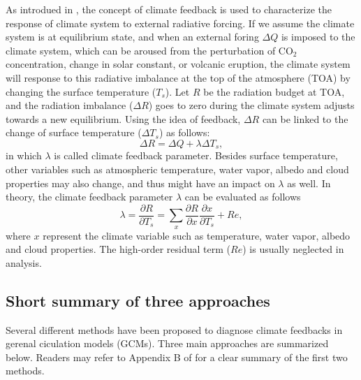 As introdued in , 
the concept of climate feedback is used to characterize the response of climate system to external radiative forcing. If we assume the climate system is at equilibrium state, and when an external foring $\Delta Q$ is imposed to the climate system, which can be aroused from the perturbation of CO$_2$ concentration, change in solar constant, or volcanic eruption, the climate system will response to this radiative imbalance at the top of the atmosphere (TOA) by changing the surface temperature ($T_s$). Let $R$ be the radiation budget at TOA, and the radiation imbalance ($\Delta R$) goes to zero during the climate system adjusts towards a new equilibrium. Using the idea of feedback, $\Delta R$ can be linked to the change of surface temperature ($\Delta T_s$) as follows:
\begin{equation}
    \Delta R = \Delta Q + \lambda \Delta T_s,
    \label{eq:imbalance_forcing_lambda}
\end{equation}
in which $\lambda$ is called climate feedback parameter. Besides surface temperature, other variables such as atmospheric temperature, water vapor, albedo and cloud properties may also change, and thus might have an impact on $\lambda$ as well. In theory, the climate feedback parameter $\lambda$ can be evaluated as follows
\begin{equation}
    \lambda = \frac{\partial R}{\partial T_s} = \sum_x \frac{\partial R}{\partial x}\frac{\partial x}{\partial T_s}  + Re, %
    \label{eq:lambda}
\end{equation}
where $x$ represent the climate variable such as temperature, water vapor, albedo and cloud properties. The high-order residual term ($Re$) is usually neglected in analysis.

\subsection{Short summary of three approaches}
\label{sec:three_climate_fbk_methods}

Several different methods have been proposed to diagnose climate feedbacks in gerenal ciculation models (GCMs). Three main approaches are summarized below. Readers may refer to Appendix B of \cite{Bony2006} for a clear summary of the first two methods.%

